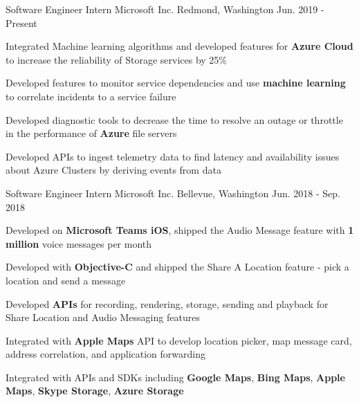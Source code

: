 


\begin{cventries}

\begin{comment}
\cventry
{Software Engineer Intern}
{Microsoft}
{Redmond, Washington}
{Jun. 2018 - Sep. 2018}
{
\begin{cvitems}
\item {Will develop on the frameworks team}
\end{cvitems}
}
\end{comment}

\cventry
	{Software Engineer Intern}
	{Microsoft Inc.}
	{Redmond, Washington}
	{Jun. 2019 - Present}
{								
	\begin{cvitems} 
        \item {Integrated Machine learning algorithms and developed features for \textbf{Azure Cloud} to increase the reliability of Storage services by 25\%}
                \item {Developed features to monitor service dependencies and use \textbf{machine learning} to correlate incidents to a service failure}
                \item {Developed diagnostic tools to decrease the time to resolve an outage or throttle in the performance of \textbf{Azure} file servers}
                \item {Developed APIs to ingest telemetry data to find latency and availability issues about Azure Clusters by deriving events from data}
	\end{cvitems}
}

\cventry
	{Software Engineer Intern}
	{Microsoft Inc.}
	{Bellevue, Washington}
	{Jun. 2018 - Sep. 2018}
{								
	\begin{cvitems}
        \item {Developed on \textbf{Microsoft Teams iOS}, shipped the Audio Message feature with \textbf{1 million} voice messages per month}
        \item {Developed with \textbf{Objective-C} and shipped the Share A Location feature - pick a location and send a message}
        \item {Developed \textbf{APIs} for recording, rendering, storage, sending and playback for Share Location and Audio Messaging features}
        \item {Integrated with \textbf{Apple Maps} API to develop location picker, map message card, address correlation, and application forwarding}
        \item {Integrated with APIs and SDKs including \textbf{Google Maps}, \textbf{Bing Maps}, \textbf{Apple Maps}, \textbf{Skype Storage}, \textbf{Azure Storage}}
	\end{cvitems}
}


\end{cventries}
